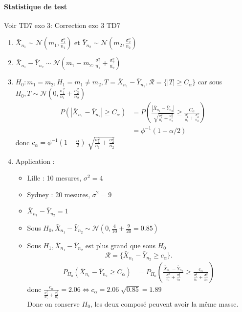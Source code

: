 \documentclass{article}
\theoremstyle{plain}%
\theoremstyle{definition}
\theoremstyle{remark}
\begin{document}
\paragraph*{Statistique de test}
Voir TD7 exo 3: Correction exo 3 TD7 \\
\begin{enumerate}
    \item $ \bar{X}_{n_1} \sim \mathcal{N}(m_1, \frac{\sigma _1^2}{n_1}) $ et $ \bar{Y}_{n_2} \sim \mathcal{N}(m_2, \frac{\sigma _2^2}{n_2}) $ 
    \item $ \bar{X}_{n_1} - \bar{Y}_{n_2} \sim \mathcal{N}(m_1-m_2, \frac{\sigma _1^2}{n_1} + \frac{\sigma _2^2}{n_2}) $ 
    \item $ H_0 : m_1 = m_2, H_1 = m_1 \neq m_2, T = \bar{X}_{n_1} - \bar{Y}_{n_2}, \mathcal{R} = \{\left| T \right| \geq C_\alpha \}$ car sous $ H_0, T \sim \mathcal{N}(0, \frac{\sigma _1^2}{n_1}+\frac{\sigma _2^2}{n_2}) $
    \begin{align*}
        P(\left| \bar{X}_{n_1} - \bar{Y}_{n_2} \right| \geq C_\alpha ) &= P(\frac{\left| \bar{X}_{n_1} - \bar{Y}_{n_2} \right|}{\sqrt[]{\frac{\sigma _1^2}{n_1} + \frac{\sigma _2^2}{n_2}}} \geq \frac{C_\alpha }{\frac{\sigma _1^2}{n_1} + \frac{\sigma _2^2}{n_2}}) \\
        &= \phi ^{-1} (1 - \alpha /2)
    \end{align*}
    donc $ c_\alpha = \phi ^{-1} (1 - \frac{\alpha }{2}) \sqrt[]{\frac{\sigma _1^2}{n_1} + \frac{\sigma _2^2}{n_2}} $ 
    \item Application : \begin{itemize}
        \item Lille : 10 mesures, $ \sigma ^2 = 4 $ 
        \item Sydney : 20 mesures, $ \sigma ^2 = 9 $ 
        \item $ \bar{X}_{n_1} - \bar{Y}_{n_2} = 1 $
        \item Sous $ H_0, \bar{X}_{n_1} - \bar{Y}_{n_2} \sim \mathcal{N}(0, \frac{4}{10} + \frac{9}{20} = 0.85) $ 
        \item Sous $ H_1, \bar{X}_{n_1} - \bar{Y}_{n_2} $ est plus grand que sous $ H_0 $ 
        \[
            \mathcal{R} = \{\bar{X}_{n_1} - \bar{Y}_{n_2} \geq c_\alpha \}
        .\]
        \begin{align*}
            P_{H_0}(\bar{X}_{n_1} - \bar{Y}_{n_2} \geq C_\alpha ) &= P_{H_0}( \frac{\bar{X}_{n_1} - \bar{Y}_{n_2}}{\frac{\sigma _1^2}{n_1} + \frac{\sigma _2^2}{n_2}} \geq \frac{c_\alpha }{\frac{\sigma _1^2}{n_1} + \frac{\sigma _2^2}{n_2}})
        \end{align*}
        donc $ \frac{c_\alpha }{\frac{\sigma _1^2}{n_1} + \frac{\sigma _2^2}{n_2}} = 2.06 \Leftrightarrow c_\alpha = 2.06 \sqrt[]{0.85} = 1.89 $ \\
        Donc on conserve $ H_0 $, les deux composé peuvent avoir la même masse.
    \end{itemize}
\end{enumerate}
\end{document}

